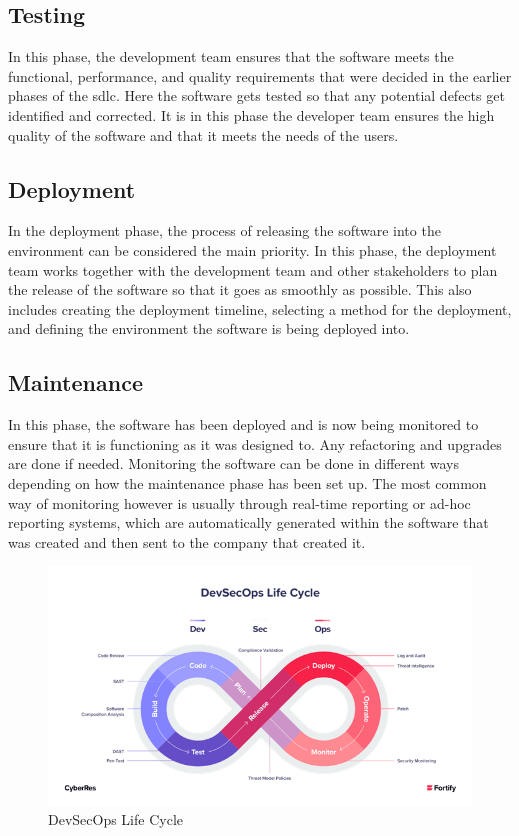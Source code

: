 \subsection{Testing}
In this phase, the development team ensures that the software meets the functional, performance, and quality requirements that were decided in the earlier phases of the \acrshort{sdlc}. Here the software gets tested so that any potential defects get identified and corrected. It is in this phase the developer team ensures the high quality of the software and that it meets the needs of the users. \cite{TestingSDLC}
 
\subsection{Deployment}
In the deployment phase, the process of releasing the software into the environment can be considered the main priority. In this phase, the deployment team works together with the development team and other stakeholders to plan the release of the software so that it goes as smoothly as possible. This also includes creating the deployment timeline, selecting a method for the deployment, and defining the environment the software is being deployed into. \cite{DeploymentSDLC}

\subsection{Maintenance} 
In this phase, the software has been deployed and is now being monitored to ensure that it is functioning as it was designed to. Any refactoring and upgrades are done if needed. Monitoring the software can be done in different ways depending on how the maintenance phase has been set up. The most common way of monitoring however is usually through real-time reporting or ad-hoc reporting systems, which are automatically generated within the software that was created and then sent to the company that created it.\cite{MaintenanceSDLC} 

\begin{figure}[H]
    \centering
    \includegraphics[width=0.8\columnwidth]{Images/devsec.png}
    \caption{DevSecOps Life Cycle}
    \label{fig: DevSecOps Life Cycle}
\end{figure}


